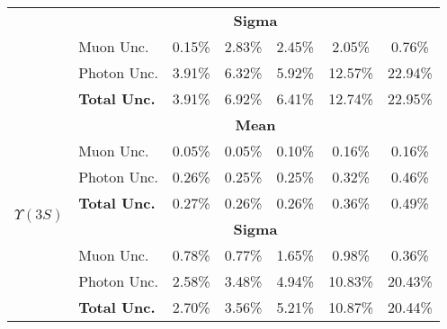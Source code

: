 \begin{tabular}{cl|c|c|c|c|c|}
\multicolumn{1}{|c|}{}                    & \multicolumn{6}{c|}{\textbf{Sigma}}            \\ \cline{2-7}
\multicolumn{1}{|c|}{}                    & Muon Unc.           & 0.15\% & 2.83\% & 2.45\% & 2.05\% & 0.76\% \\ \cline{2-7}
\multicolumn{1}{|c|}{}                    & Photon Unc.         & 3.91\% & 6.32\% & 5.92\% & 12.57\% & 22.94\% \\ \cline{2-7}
\multicolumn{1}{|c|}{}                    & \textbf{Total Unc.} & 3.91\% & 6.92\% & 6.41\% & 12.74\% & 22.95\% \\ \hline \hline



\multicolumn{1}{|c|}{\multirow{8}{*}{$\Upsilon(3S)$}} & \multicolumn{6}{c|}{\textbf{Mean}}  \\ \cline{2-7}
\multicolumn{1}{|c|}{}                    & Muon Unc.           & 0.05\% & 0.05\% & 0.10\% & 0.16\% & 0.16\% \\ \cline{2-7}
\multicolumn{1}{|c|}{}                    & Photon Unc.         & 0.26\% & 0.25\% & 0.25\% & 0.32\% & 0.46\% \\ \cline{2-7}
\multicolumn{1}{|c|}{}                    & \textbf{Total Unc.} & 0.27\% & 0.26\% & 0.26\% & 0.36\% & 0.49\% \\ \cline{2-7}


\multicolumn{1}{|c|}{}                    & \multicolumn{6}{c|}{\textbf{Sigma}}            \\ \cline{2-7}
\multicolumn{1}{|c|}{}                    & Muon Unc.           & 0.78\% & 0.77\% & 1.65\% & 0.98\% & 0.36\% \\ \cline{2-7}
\multicolumn{1}{|c|}{}                    & Photon Unc.         & 2.58\% & 3.48\% & 4.94\% & 10.83\% & 20.43\% \\ \cline{2-7}
\multicolumn{1}{|c|}{}                    & \textbf{Total Unc.} & 2.70\% & 3.56\% & 5.21\% & 10.87\% & 20.44\% \\ \hline
\end{tabular}
